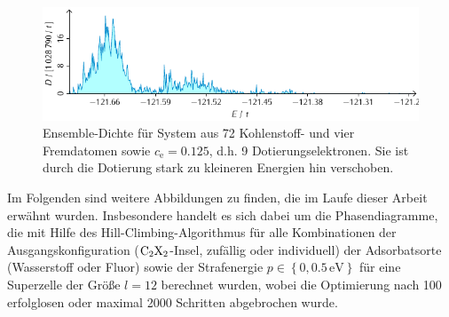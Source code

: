 \documentclass[a4paper, 10pt, twoside, openany]{book} %
\newcommand \braces[1]{\left \lbrace #1 \right \rbrace}
\def \cE {c_\mathrm{e}}
\begin{document}
%
\begin{figure}
    \includegraphics[width=\textwidth]{Abbildungen/Zustandsdichten/84.pdf}
    \caption[Ensemble-Dichte mit Dotierung]{Ensemble-Dichte für System aus 72 Kohlenstoff- und vier Fremdatomen sowie $\cE = 0.125$, d.h. 9 Dotierungselektronen. Sie ist durch die Dotierung stark zu kleineren Energien hin verschoben.}
    \label{Phasenvolumen2}
\end{figure}
%
Im Folgenden sind weitere Abbildungen zu finden, die im Laufe dieser Arbeit erwähnt wurden. Insbesondere handelt es sich dabei um die Phasendiagramme, die mit Hilfe des Hill-Climbing-Algorithmus für alle Kombinationen der Ausgangskonfiguration ($\rm C_2X_2$-Insel, zufällig oder individuell) der Adsorbatsorte (Wasserstoff oder Fluor) sowie der Strafenergie $p \in \braces{0, 0.5\,\mathrm{eV}}$ für eine Superzelle der Größe $l = 12$ berechnet wurden, wobei die Optimierung nach 100 erfolglosen oder maximal 2000 Schritten abgebrochen wurde.
\end{document}
